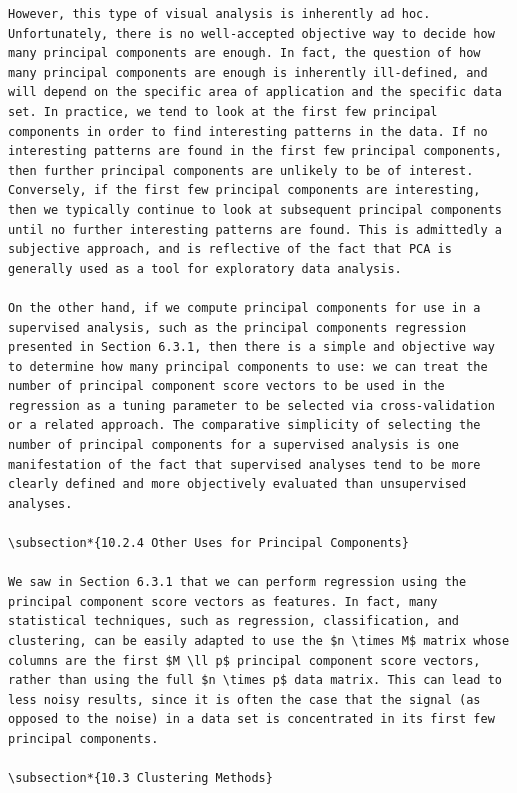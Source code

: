 \documentclass[10pt]{article}
\begin{document}
\begin{verbatim}
However, this type of visual analysis is inherently ad hoc. Unfortunately, there is no well-accepted objective way to decide how many principal components are enough. In fact, the question of how many principal components are enough is inherently ill-defined, and will depend on the specific area of application and the specific data set. In practice, we tend to look at the first few principal components in order to find interesting patterns in the data. If no interesting patterns are found in the first few principal components, then further principal components are unlikely to be of interest. Conversely, if the first few principal components are interesting, then we typically continue to look at subsequent principal components until no further interesting patterns are found. This is admittedly a subjective approach, and is reflective of the fact that PCA is generally used as a tool for exploratory data analysis.

On the other hand, if we compute principal components for use in a supervised analysis, such as the principal components regression presented in Section 6.3.1, then there is a simple and objective way to determine how many principal components to use: we can treat the number of principal component score vectors to be used in the regression as a tuning parameter to be selected via cross-validation or a related approach. The comparative simplicity of selecting the number of principal components for a supervised analysis is one manifestation of the fact that supervised analyses tend to be more clearly defined and more objectively evaluated than unsupervised analyses.

\subsection*{10.2.4 Other Uses for Principal Components}

We saw in Section 6.3.1 that we can perform regression using the principal component score vectors as features. In fact, many statistical techniques, such as regression, classification, and clustering, can be easily adapted to use the $n \times M$ matrix whose columns are the first $M \ll p$ principal component score vectors, rather than using the full $n \times p$ data matrix. This can lead to less noisy results, since it is often the case that the signal (as opposed to the noise) in a data set is concentrated in its first few principal components.

\subsection*{10.3 Clustering Methods}


\end{verbatim}
\end{document}
